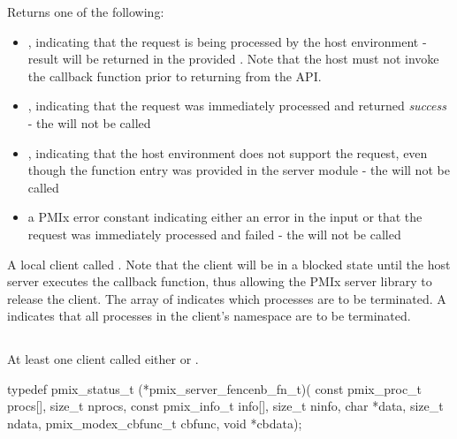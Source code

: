 Returns one of the following:

\begin{itemize}
    \item {}, indicating that the request is being processed by the host environment - result will be returned in the provided . Note that the host must not invoke the callback function prior to returning from the \ac{API}.
    \item {}, indicating that the request was immediately processed and returned \textit{success} - the  will not be called
    \item {}, indicating that the host environment does not support the request, even though the function entry was provided in the server module - the  will not be called
    \item a PMIx error constant indicating either an error in the input or that the request was immediately processed and failed - the  will not be called
\end{itemize}

\descr

A local client called .
Note that the client will be in a blocked state until the host server executes the callback function, thus allowing the \ac{PMIx} server library to release the client.
The array of  indicates which processes are to be terminated.
A  indicates that all processes in the client's namespace are to be terminated.


\subsection{}

\summary

At least one client called either  or .

\format

\cspecificstart
\begin{codepar}
typedef pmix_status_t (*pmix_server_fencenb_fn_t)(
                             const pmix_proc_t procs[],
                             size_t nprocs,
                             const pmix_info_t info[],
                             size_t ninfo,
                             char *data, size_t ndata,
                             pmix_modex_cbfunc_t cbfunc,
                             void *cbdata);
\end{codepar}
\cspecificend

